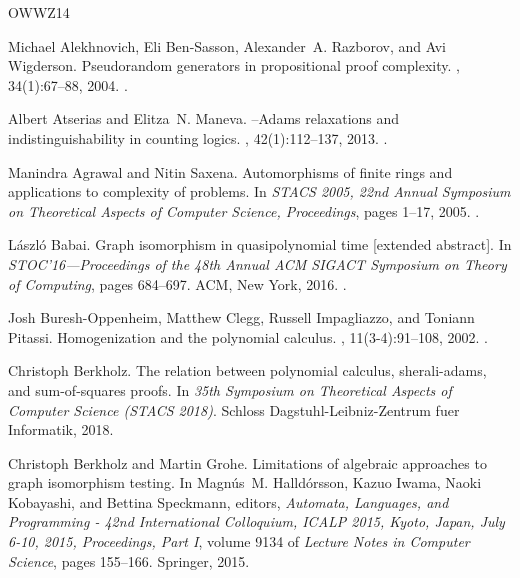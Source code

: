 \documentclass[10pt,a4paper]{article}
\theoremstyle{definition}
\begin{document}
\newcommand{\etalchar}[1]{$^{#1}$}
\begin{thebibliography}{OWWZ14}

Michael Alekhnovich, Eli Ben{-}Sasson, Alexander~A. Razborov, and Avi
  Wigderson.
\newblock Pseudorandom generators in propositional proof complexity.
, 34(1):67--88, 2004.
\newblock \href {https://doi.org/10.1137/S0097539701389944}
  {}.

Albert Atserias and Elitza~N. Maneva.
--{Adams} relaxations and indistinguishability in counting
  logics.
, 42(1):112--137, 2013.
\newblock \href {https://doi.org/10.1137/120867834}
  {}.

Manindra Agrawal and Nitin Saxena.
\newblock Automorphisms of finite rings and applications to complexity of
  problems.
\newblock In {\em {STACS} 2005, 22nd Annual Symposium on Theoretical Aspects of
  Computer Science, Proceedings}, pages 1--17, 2005.
\newblock \href {https://doi.org/10.1007/978-3-540-31856-9_1}
  {}.

L\'{a}szl\'{o} Babai.
\newblock Graph isomorphism in quasipolynomial time [extended abstract].
\newblock In {\em S{TOC}'16---{P}roceedings of the 48th {A}nnual {ACM} {SIGACT}
  {S}ymposium on {T}heory of {C}omputing}, pages 684--697. ACM, New York, 2016.
\newblock \href {https://doi.org/10.1145/2897518.2897542}
  {}.

Josh Buresh{-}Oppenheim, Matthew Clegg, Russell Impagliazzo, and Toniann
  Pitassi.
\newblock Homogenization and the polynomial calculus.
, 11(3-4):91--108, 2002.
\newblock \href {https://doi.org/10.1007/s00037-002-0171-6}
  {}.

Christoph Berkholz.
\newblock The relation between polynomial calculus, sherali-adams, and
  sum-of-squares proofs.
\newblock In {\em 35th Symposium on Theoretical Aspects of Computer Science
  (STACS 2018)}. Schloss Dagstuhl-Leibniz-Zentrum fuer Informatik, 2018.

Christoph Berkholz and Martin Grohe.
\newblock Limitations of algebraic approaches to graph isomorphism testing.
\newblock In Magn{\'{u}}s~M. Halld{\'{o}}rsson, Kazuo Iwama, Naoki Kobayashi,
  and Bettina Speckmann, editors, {\em Automata, Languages, and Programming -
  42nd International Colloquium, {ICALP} 2015, Kyoto, Japan, July 6-10, 2015,
  Proceedings, Part {I}}, volume 9134 of {\em Lecture Notes in Computer
  Science}, pages 155--166. Springer, 2015.


\end{thebibliography}
\end{document}
